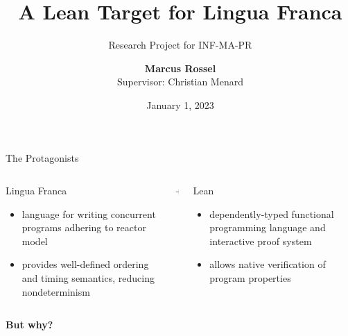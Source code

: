 \documentclass[aspectratio=169]{beamer}
\title{A Lean Target for Lingua Franca}
\subtitle{Research Project for INF-MA-PR}
\author{\textbf{Marcus Rossel}\\[1ex] Supervisor: Christian Menard}
\institute{\textbf{Chair for Compiler Construction}\\[1ex] Technische Universität Dresden}
\date{January 1, 2023}
\begin{document}
\frame{\titlepage}


\begin{frame}{The Protagonists}
\begin{columns}[t, onlytextwidth]

\begin{column}{0.47\textwidth} 
\begin{block}{Lingua Franca}
  \begin{itemize}
    \item language for writing concurrent programs adhering to reactor model
    \item provides well-defined ordering and timing semantics, reducing nondeterminism
  \end{itemize}
\end{block}
\end{column}

\begin{column}{0.04\textwidth} 
\begin{center}
$+$
\end{center}
\end{column}

\begin{column}{0.47\textwidth} 
\begin{block}{Lean}
  \begin{itemize}
    \item dependently-typed functional programming language and interactive proof system
    \item allows native verification of program properties
  \end{itemize}
\end{block}
\end{column}

\end{columns}

\pause

\vspace{3mm}

\begin{center}
\textbf{But why?}
\end{center}
\end{frame}

\end{document}
